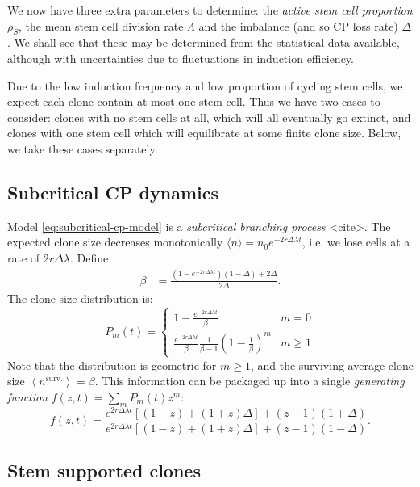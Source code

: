 \documentclass[10pt,UKenglish]{article}
\begin{document}
We now have three extra parameters to determine: the \emph{active stem cell proportion} $\rho_S$, the mean stem cell division rate $\Lambda$ and the imbalance (and so CP loss rate) $\Delta$. We shall see that these may be determined from the statistical data available, although with uncertainties due to fluctuations in induction efficiency.

Due to the low induction frequency and low proportion of cycling stem cells, we expect each clone contain at most one stem cell. Thus we have two cases to consider: clones with no stem cells at all, which will all eventually go extinct, and clones with one stem cell which will equilibrate at some finite clone size. Below, we take these cases separately.

\subsection{Subcritical CP dynamics}

Model \ref{eq:subcritical-cp-model} is a \emph{subcritical branching process} <cite>. The expected clone size decreases monotonically $\langle n \rangle = n_0 e^{-2 r \Delta \lambda t}$, i.e. we lose cells at a rate of $2 r \Delta \lambda$. Define
\begin{align*}
\beta &= \frac{\left(1-e^{-2 r \Delta \lambda t}\right)(1-\Delta)+2\Delta}{2\Delta}.
\end{align*}
The clone size distribution is:
\begin{equation*}
P_m(t) = \begin{cases}
1 - \frac{e^{-2 r \Delta \lambda t}}{\beta} & m=0 \\
\frac{e^{-2 r \Delta \lambda t}}{\beta} \frac{1}{\beta-1} \left(1-\frac{1}{\beta}\right)^m & m\ge1
\end{cases}
\end{equation*}
Note that the distribution is geometric for $m \ge 1$, and the surviving average clone size $\left\langle n^\textrm{surv.} \right\rangle = \beta$. This information can be packaged up into a single \emph{generating function} $f(z,t) = \sum_m P_m(t) z^m$:
\begin{equation*}
f(z,t) = \frac{e^{2 r \Delta \lambda t}\left[(1-z) + (1+z)\Delta\right] + (z-1)(1+\Delta)}{e^{2 r \Delta \lambda t}\left[(1-z) + (1+z)\Delta\right] + (z-1)(1-\Delta)}.
\end{equation*}

\subsection{\label{sec:subcritical-immigration}Stem supported clones}
\end{document}
